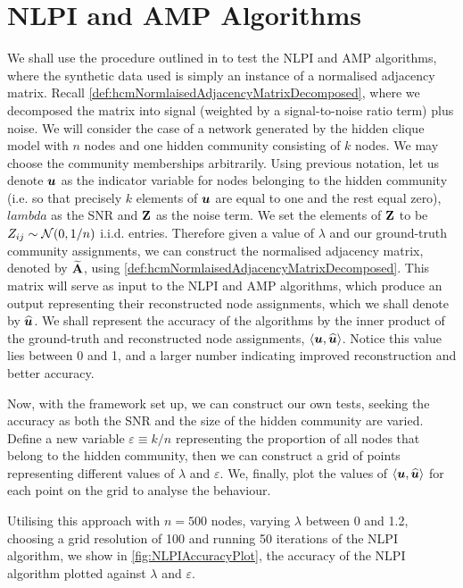 \section{NLPI and AMP Algorithms}
\label{sec:NLPIAndAMPAlgorithms}

We shall use the procedure outlined in \cite{Mon13} to test the NLPI and AMP algorithms, where the synthetic data used is simply an instance of a normalised adjacency matrix. Recall \cref{def:hcmNormlaisedAdjacencyMatrixDecomposed}, where we decomposed the matrix into signal (weighted by a signal-to-noise ratio term) plus noise.
We will consider the case of a network generated by the hidden clique model with $n$ nodes and one hidden community consisting of $k$ nodes.
We may choose the community memberships arbitrarily. Using previous notation, let us denote $\vecvar{u}$ as the indicator variable for nodes belonging to the hidden community (i.e. so that precisely $k$ elements of $\vecvar{u}$ are equal to one and the rest equal zero), $lambda$ as the SNR and $\mathbf Z$ as the noise term.
We set the elements of $\mathbf Z$ to be $Z_{ij} \sim \normal{0,1/n}$ i.i.d. entries. Therefore given a value of $\lambda$ and our ground-truth community assignments, we can construct the normalised adjacency matrix, denoted by $\widetilde{\mathbf A}$, using \cref{def:hcmNormlaisedAdjacencyMatrixDecomposed}.
This matrix will serve as input to the NLPI and AMP algorithms, which produce an output representing their reconstructed node assignments, which we shall denote by $\widehat{\vecvar{u}}$.
We shall represent the accuracy of the algorithms by the inner product of the ground-truth and reconstructed node assignments, $\innerP{\vecvar{u},\widehat{\vecvar{u}}}$.
Notice this value lies between 0 and 1, and a larger number indicating improved reconstruction and better accuracy.

Now, with the framework set up, we can construct our own tests, seeking the accuracy as both the SNR and the size of the hidden community are varied.
Define a new variable $\varepsilon \equiv k/n$ representing the proportion of all nodes that belong to the hidden community, then we can construct a grid of points representing different values of $\lambda$ and $\varepsilon$.
We, finally, plot the values of $\innerP{\vecvar{u},\widehat{\vecvar{u}}}$ for each point on the grid to analyse the behaviour.

Utilising this approach with $n=500$ nodes, varying $\lambda$ between 0 and 1.2, choosing a grid resolution of 100 and running 50 iterations of the NLPI algorithm, we show in \cref{fig:NLPIAccuracyPlot}, the accuracy of the NLPI algorithm plotted against $\lambda$ and $\varepsilon$.

